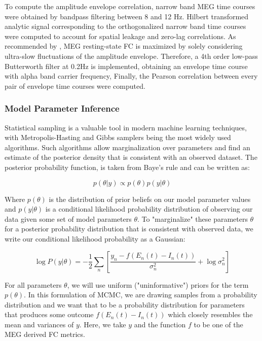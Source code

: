 To compute the amplitude envelope correlation, narrow band MEG time courses were obtained by bandpass filtering between 8 and 12 Hz. Hilbert transformed analytic signal corresponding to the orthogonalized narrow band time courses were computed to account for spatial leakage and zero-lag correlations. As recommended by \cite{hipp_large-scale_2012, brookes_measuring_2011, deco_single_2017}, MEG resting-state FC is maximized by solely considering ultra-slow fluctuations of the amplitude envelope. Therefore, a 4th order low-pass Butterworth filter at 0.2Hz is implemented, obtaining an envelope time course with alpha band carrier frequency, Finally, the Pearson correlation between every pair of envelope time courses were computed. 

\subsubsection{Model Parameter Inference}
Statistical sampling is a valuable tool in modern machine learning techniques, with Metropolis-Hasting \cite{hastings_monte_1970} and Gibbs \cite{geman_stochastic_1984, gelfand_sampling-based_1990} samplers being the most widely used algorithms. Such algorithms allow marginalization over parameters and find an estimate of the posterior density that is consistent with an observed dataset. The posterior probability function, is taken from Baye's rule and can be written as:

\begin{equation}
    p(\theta | y) \propto p(\theta) p(y | \theta)
\end{equation}

Where $p(\theta)$ is the distribution of prior beliefs on our model parameter values and $p(y | \theta)$ is a conditional likelihood probability distribution of observing our data given some set of model parameters $\theta$. To "marginalize" these parameters $\theta$ for a posterior probability distribution that is consistent with observed data, we write our conditional likelihood probability as a Gaussian:

\begin{equation}
    \log P(y | \theta) = - \frac{1}{2} \sum_n [\frac{y_n - f(E_n(t) - I_n(t))}{\sigma_n^2} + \log \sigma_n^2]
\end{equation}

For all parameters $\theta$, we will use uniform ("uninformative") priors for the term $p(\theta)$. In this formulation of MCMC, we are drawing samples from a probability distribution and we want that to be a probability distribution for parameters that produces some outcome $f(E_n(t) - I_n(t))$ which closely resembles the mean and variances of $y$. Here, we take $y$ and the function $f$ to be one of the MEG derived FC metrics.

